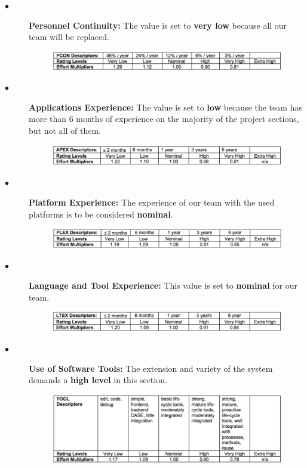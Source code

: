 \documentclass[a4paper,10pt]{article}
\begin{document}
\begin{description}
  \item[$\bullet$] \textbf{Personnel Continuity:} The value is set to \textbf{very low} because all our team will be replaced.
          \begin{figure}[!h]
  \centering
    \includegraphics[scale=0.17]{Resources/cocomo/pcon.png}
  \end{figure}\FloatBarrier
  \item[$\bullet$] \textbf{Applications Experience:} The value is set to \textbf{low} because the team has more than 6 months of experience on the majority of the project sections, but not all of them.
          \begin{figure}[!h]
  \centering
    \includegraphics[scale=0.17]{Resources/cocomo/apex.png}
  \end{figure}\FloatBarrier
  \item[$\bullet$] \textbf{Platform Experience:} The experience of our team with the used platforms is to be considered \textbf{nominal}.
          \begin{figure}[!h]
  \centering
    \includegraphics[scale=0.17]{Resources/cocomo/plex.png}
  \end{figure}\FloatBarrier
  \item[$\bullet$] \textbf{Language and Tool Experience:} This value is set to \textbf{nominal} for our team.
          \begin{figure}[!h]
  \centering
    \includegraphics[scale=0.17]{Resources/cocomo/ltex.png}
  \end{figure}\FloatBarrier
  \item[$\bullet$] \textbf{Use of Software Tools:} The extension and variety of the system demands a \textbf{high level} in this section.
          \begin{figure}[!h]
  \centering
    \includegraphics[scale=0.32]{Resources/cocomo/tool.png}

\end{figure}
\end{description}
\end{document}
